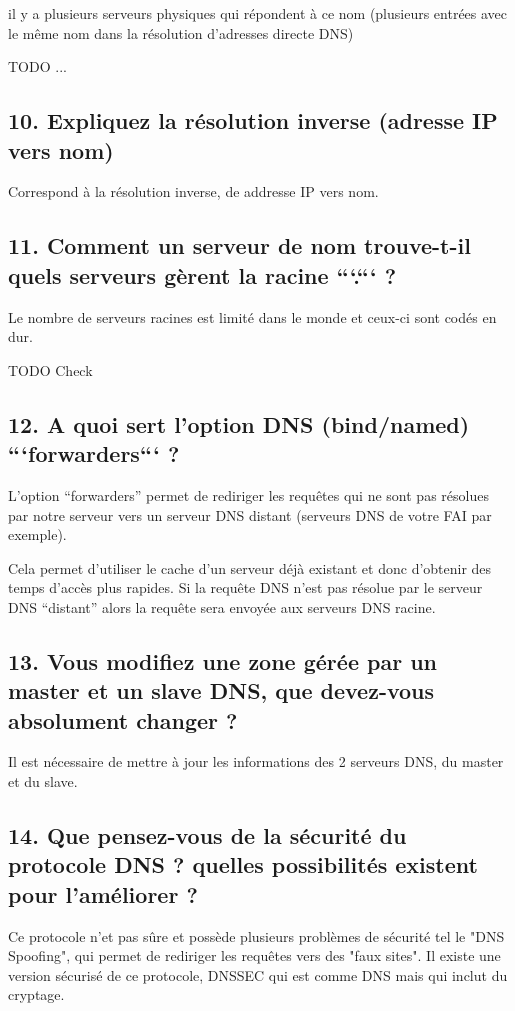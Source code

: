 \documentclass{article}
\begin{document}
il y a plusieurs serveurs physiques qui répondent à ce nom (plusieurs entrées avec le même nom dans la résolution d'adresses directe DNS)

TODO ...

\subsection*{10. Expliquez la résolution inverse (adresse IP vers nom)}
Correspond à la résolution inverse, de addresse IP vers nom.

\subsection*{11. Comment un serveur de nom trouve-t-il quels serveurs gèrent la racine ```.``` ?}
Le nombre de serveurs racines est limité dans le monde et ceux-ci sont codés en dur.

TODO Check

\subsection*{12. A quoi sert l’option DNS (bind/named) ```forwarders``` ?}
L'option “forwarders” permet de rediriger les requêtes qui ne sont pas résolues par notre serveur vers un serveur DNS distant (serveurs DNS de votre FAI par exemple).

Cela permet d'utiliser le cache d'un serveur déjà existant et donc d'obtenir des temps d'accès plus rapides. Si la requête DNS n'est pas résolue par le serveur DNS “distant” alors la requête sera envoyée aux serveurs DNS racine.

\subsection*{13. Vous modifiez une zone gérée par un master et un slave DNS, que devez-vous absolument changer ?}
Il est nécessaire de mettre à jour les informations des 2 serveurs DNS, du master et du slave.

\subsection*{14. Que pensez-vous de la sécurité du protocole DNS ? quelles possibilités existent pour l’améliorer ?}
Ce protocole n'et pas sûre et possède plusieurs problèmes de sécurité tel le "DNS Spoofing", qui permet de rediriger les requêtes vers des "faux sites". Il existe une version sécurisé de ce protocole, DNSSEC qui est comme DNS mais qui inclut du cryptage.
\end{document}

